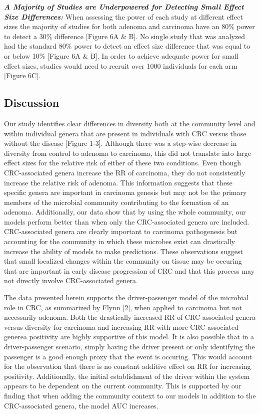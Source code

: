 \documentclass[12pt,]{article}
\begin{document}
\textbf{\emph{A Majority of Studies are Underpowered for Detecting Small
Effect Size Differences:}} When assessing the power of each study at
different effect sizes the majority of studies for both adenoma and
carcinoma have an 80\% power to detect a 30\% difference {[}Figure 6A \&
B{]}. No single study that was analyzed had the standard 80\% power to
detect an effect size difference that was equal to or below 10\%
{[}Figure 6A \& B{]}. In order to achieve adequate power for small
effect sizes, studies would need to recruit over 1000 individuals for
each arm {[}Figure 6C{]}.

\newpage

\subsection{Discussion}\label{discussion}

Our study identifies clear differences in diversity both at the
community level and within individual genera that are present in
individuals with CRC versus those without the disease {[}Figure 1-3{]}.
Although there was a step-wise decrease in diversity from control to
adenoma to carcinoma, this did not translate into large effect sizes for
the relative risk of either of these two conditions. Even though
CRC-associated genera increase the RR of carcinoma, they do not
consistently increase the relative risk of adenoma. This information
suggests that these specific genera are important in carcinoma genesis
but may not be the primary members of the microbial community
contributing to the formation of an adenoma. Additionally, our data show
that by using the whole community, our models perform better than when
only the CRC-associated genera are included. CRC-associated genera are
clearly important to carcinoma pathogenesis but accounting for the
community in which these microbes exist can drastically increase the
ability of models to make predictions. These observations suggest that
small localized changes within the community on tissue may be occuring
that are important in early disease progression of CRC and that this
process may not directly involve CRC-associated genera.

The data presented herein supports the driver-passenger model of the
microbial role in CRC, as summarized by Flynn {[}2{]}, when applied to
carcinoma but not necessarily adenoma. Both the drastically increased RR
of CRC-associated genera versus diversity for carcinoma and increasing
RR with more CRC-associated generea positivity are highly supportive of
this model. It is also possible that in a driver-passenger scenario,
simply having the driver present or only identifying the passenger is a
good enough proxy that the event is occuring. This would account for the
observation that there is no constant additive effect on RR for
increasing positivity. Additionally, the initial establishment of the
driver within the system appears to be dependent on the current
community. This is supported by our finding that when adding the
community context to our models in addition to the CRC-associated
genera, the model AUC increases.
\end{document}
